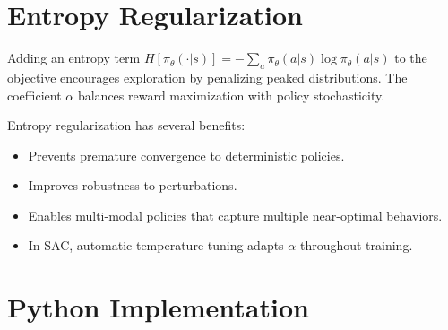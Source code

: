 \section{Entropy Regularization}
\label{sec:entropy}

\begin{definition}
Adding an entropy term $H[\pi_\theta(\cdot|s)] = -\sum_a \pi_\theta(a|s)
\log \pi_\theta(a|s)$ to the objective encourages exploration by
penalizing peaked distributions. The coefficient $\alpha$ balances
reward maximization with policy stochasticity.
\end{definition}

\begin{remark}
Entropy regularization has several benefits:
\begin{itemize}
    \item Prevents premature convergence to deterministic policies.
    \item Improves robustness to perturbations.
    \item Enables multi-modal policies that capture multiple near-optimal
    behaviors.
    \item In SAC, automatic temperature tuning adapts $\alpha$ throughout
    training.
\end{itemize}
\end{remark}

\section{Python Implementation}
\label{sec:ac:code}

